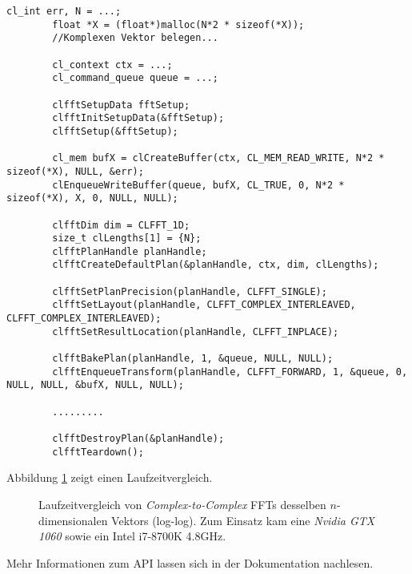 		\begin{lstlisting}[caption=clFFT Beispiel]
		cl_int err, N = ...;
		float *X = (float*)malloc(N*2 * sizeof(*X));
		//Komplexen Vektor belegen...
		
		cl_context ctx = ...;
		cl_command_queue queue = ...;
		
		clfftSetupData fftSetup;
		clfftInitSetupData(&fftSetup);
		clfftSetup(&fftSetup);

		cl_mem bufX = clCreateBuffer(ctx, CL_MEM_READ_WRITE, N*2 * sizeof(*X), NULL, &err);
		clEnqueueWriteBuffer(queue, bufX, CL_TRUE, 0, N*2 * sizeof(*X), X, 0, NULL, NULL);
		
		clfftDim dim = CLFFT_1D;
		size_t clLengths[1] = {N};
		clfftPlanHandle planHandle;
		clfftCreateDefaultPlan(&planHandle, ctx, dim, clLengths);

		clfftSetPlanPrecision(planHandle, CLFFT_SINGLE);
		clfftSetLayout(planHandle, CLFFT_COMPLEX_INTERLEAVED, CLFFT_COMPLEX_INTERLEAVED);
		clfftSetResultLocation(planHandle, CLFFT_INPLACE);

		clfftBakePlan(planHandle, 1, &queue, NULL, NULL);
		clfftEnqueueTransform(planHandle, CLFFT_FORWARD, 1, &queue, 0, NULL, NULL, &bufX, NULL, NULL);
		
		.........
		
		clfftDestroyPlan(&planHandle);
		clfftTeardown();
		\end{lstlisting}		
		
		\newpage
		
		Abbildung \ref{fig5:fft} zeigt einen Laufzeitvergleich.	
					
		\begin{figure}[h]
  			\centering
  			\caption[Vergleich von FFTs]{Laufzeitvergleich von \textit{Complex-to-Complex} FFTs desselben $n$-dimensionalen Vektors (log-log). Zum Einsatz kam eine \textit{Nvidia GTX 1060} sowie ein Intel i7-8700K 4.8GHz.}
  			\label{fig5:fft}
		\end{figure}
		
		Mehr Informationen zum \Gls{API} lassen sich in der Dokumentation nachlesen. \autocite{clfftDoc}